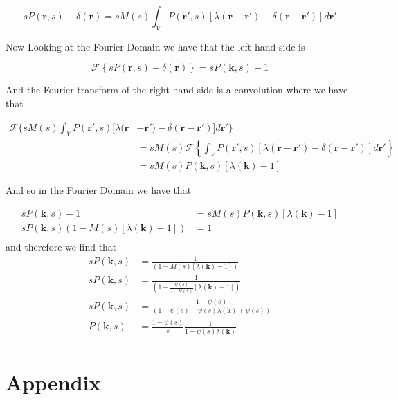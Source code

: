 \documentclass[12pt]{amsart}
\theoremstyle{definition}
\begin{document}
\begin{enumerate}
$$sP(\textbf{r},s)-\delta(\textbf{r})=sM(s)\int_{V}P(\textbf{r}',s)\left[\lambda(\textbf{r}-\textbf{r}')-\delta(\textbf{r}-\textbf{r}')\right]d\textbf{r}'$$

Now Looking at the Fourier Domain we have that the left hand side is 

$$\mathcal{F}\left\{sP(\textbf{r},s)-\delta(\textbf{r})\right\}=sP(\textbf{k},s)-1$$

And the Fourier transform of the right hand side is a convolution where we have that

\begin{align*}
\mathcal{F}\bigg\{sM(s)\int_{V}P(\textbf{r}',s)[\lambda(\textbf{r}&-\textbf{r}')-\delta(\textbf{r}-\textbf{r}')]d\textbf{r}' \bigg\}\\
    &=sM(s)\mathcal{F}\left\{\int_{V}P(\textbf{r}',s)\left[\lambda(\textbf{r}-\textbf{r}')-\delta(\textbf{r}-\textbf{r}')\right]d\textbf{r}'\right\}\\
    &=sM(s) P(\textbf{k},s)\left[\lambda(\textbf{k})-1\right]
\end{align*}

And so in the Fourier Domain we have that 

\begin{align*}
    sP(\textbf{k},s)-1&=sM(s) P(\textbf{k},s)\left[\lambda(\textbf{k})-1\right]\\
    sP(\textbf{k},s)(1-M(s) \left[\lambda(\textbf{k})-1\right])&=1\\
\end{align*}
and therefore we find that
\begin{align*}
    sP(\textbf{k},s)&=\frac{1}{(1-M(s) \left[\lambda(\textbf{k})-1\right])}\\
    sP(\textbf{k},s)&=\frac{1}{(1-\frac{\psi(s)}{1-\psi(s)} \left[\lambda(\textbf{k})-1\right])}\\
    sP(\textbf{k},s)&=\frac{1-\psi(s)}{(1-\psi(s)-\psi(s) \lambda(\textbf{k})+\psi(s))}\\
    P(\textbf{k},s)&=\frac{1-\psi(s)}{s}\frac{1}{1-\psi(s) \lambda(\textbf{k})}\\
\end{align*}


    
\end{enumerate}

\newpage
\section*{Appendix}
%
%
%
\end{document}
